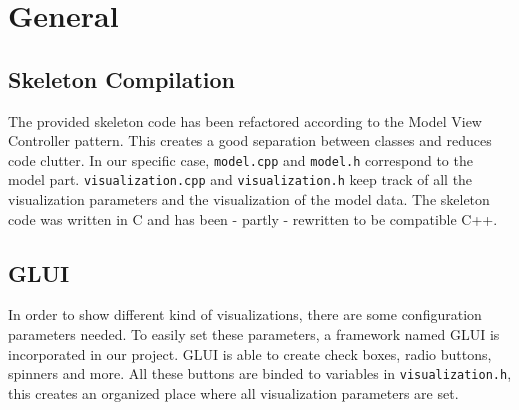 \section{General}
	\label{sec:general}

	\subsection{Skeleton Compilation}
    The provided skeleton code has been refactored according to the Model View Controller pattern. This creates a good separation between classes and reduces code clutter.
    In our specific case, \texttt{model.cpp} and \texttt{model.h} correspond to the model part. \texttt{visualization.cpp} and \texttt{visualization.h} keep track of all the visualization parameters and the visualization of the model data.
    The skeleton code was written in C and has been - partly - rewritten to be compatible C++.

    \subsection{GLUI}
        In order to show different kind of visualizations, there are some configuration parameters needed.
        To easily set these parameters, a framework named GLUI \cite{glui} is incorporated in our project.
        GLUI is able to create check boxes, radio buttons, spinners and more.
        All these buttons are binded to variables in \texttt{visualization.h}, this creates an organized place where all visualization parameters are set.
